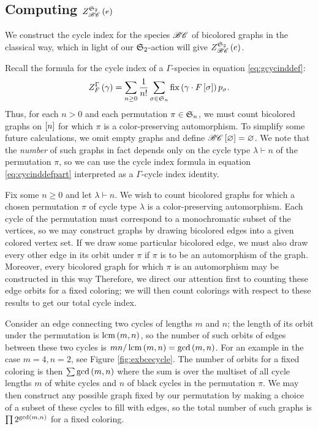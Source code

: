 \documentclass[distribution,draft]{brandiss} %
\numberwithin{section}{chapter}
\numberwithin{figure}{chapter}
\begin{document}
\subsection{Computing $\gcielt{\symgp{2}}{\specname{BC}}{e}$}\label{ss:ecibc}
We construct the cycle index for the species $\specname{BC}$ of bicolored graphs in the classical way, which in light of our $\symgp{2}$-action will give $\gcielt{\symgp{2}}{\specname{BC}}{e}$. 

Recall the formula for the cycle index of a $\Gamma$-species in equation \eqref{eq:gcycinddef}:
\begin{equation*}
  \gcielt{\Gamma}{F}{\gamma} = \sum_{n \geq 0} \frac{1}{n!} \sum_{\sigma \in \symgp{n}} \fix \pbrac{\gamma \cdot F \sbrac{\sigma}} p_{\sigma}.
\end{equation*}
Thus, for each $n > 0$ and each permutation $\pi \in \symgp{n}$, we must count bicolored graphs on $\sbrac{n}$ for which $\pi$ is a color-preserving automorphism.
To simplify some future calculations, we omit empty graphs and define $\specname{BC} \sbrac{\varnothing} = \varnothing$.
We note that the \emph{number} of such graphs in fact depends only on the cycle type $\lambda \vdash n$ of the permutation $\pi$, so we can use the cycle index formula in equation \eqref{eq:cycinddefpart} interpreted as a $\Gamma$-cycle index identity.

Fix some $n \geq 0$ and let $\lambda \vdash n$.
We wish to count bicolored graphs for which a chosen permutation $\pi$ of cycle type $\lambda$ is a color-preserving automorphism.
Each cycle of the permutation must correspond to a monochromatic subset of the vertices, so we may construct graphs by drawing bicolored edges into a given colored vertex set.
If we draw some particular bicolored edge, we must also draw every other edge in its orbit under $\pi$ if $\pi$ is to be an automorphism of the graph.
Moreover, every bicolored graph for which $\pi$ is an automorphism may be constructed in this way
Therefore, we direct our attention first to counting these edge orbits for a fixed coloring; we will then count colorings with respect to these results to get our total cycle index.

Consider an edge connecting two cycles of lengths $m$ and $n$; the length of its orbit under the permutation is $\lcm \pbrac{m, n}$, so the number of such orbits of edges between these two cycles is $mn / \lcm \pbrac{m, n} = \gcd \pbrac{m, n}$.
For an example in the case $m = 4, n = 2$, see Figure \ref{fig:exbcecycle}.
The number of orbits for a fixed coloring is then $\sum \gcd \pbrac{m, n}$ where the sum is over the multiset of all cycle lengths $m$ of white cycles and $n$ of black cycles in the permutation $\pi$.
We may then construct any possible graph fixed by our permutation by making a choice of a subset of these cycles to fill with edges, so the total number of such graphs is $\prod 2^{\gcd \pbrac{m, n}}$ for a fixed coloring.
\end{document}
